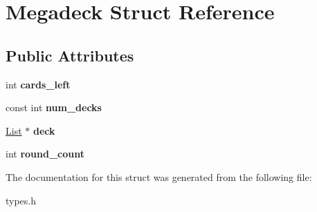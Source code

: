 \hypertarget{struct_megadeck}{\section{Megadeck Struct Reference}
\label{struct_megadeck}
}
\subsection*{Public Attributes}
\begin{DoxyCompactItemize}
\item 
\hypertarget{struct_megadeck_a8ebb9b3ca70be0feae14be63b282f06f}{int {\bfseries cards\-\_\-left}}\label{struct_megadeck_a8ebb9b3ca70be0feae14be63b282f06f}

\item 
\hypertarget{struct_megadeck_a7d85ea0e77e0ffa4ddeef25fead532d6}{const int {\bfseries num\-\_\-decks}}\label{struct_megadeck_a7d85ea0e77e0ffa4ddeef25fead532d6}

\item 
\hypertarget{struct_megadeck_a3f9574fb34ebf99564f7354d8cb7eaea}{\hyperlink{struct_list}{List} $\ast$ {\bfseries deck}}\label{struct_megadeck_a3f9574fb34ebf99564f7354d8cb7eaea}

\item 
\hypertarget{struct_megadeck_a30a776381e363ddf203a0fdc66a1778c}{int {\bfseries round\-\_\-count}}\label{struct_megadeck_a30a776381e363ddf203a0fdc66a1778c}

\end{DoxyCompactItemize}


The documentation for this struct was generated from the following file\-:\begin{DoxyCompactItemize}
\item 
types.\-h\end{DoxyCompactItemize}
